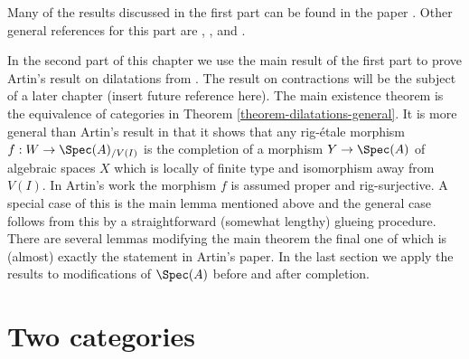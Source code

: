 \medskip\noindent
Many of the results discussed in the first part can be found in the paper
\cite{Elkik}. Other general references for this part are
\cite{EGA}, \cite{Abbes}, and \cite{Fujiwara-Kato}.

\medskip\noindent
In the second part of this chapter we use the main result of
the first part to prove Artin's result on dilatations from \cite{ArtinII}.
The result on contractions will be the subject of a later chapter
(insert future reference here).
The main existence theorem is the equivalence of categories in
Theorem \ref{theorem-dilatations-general}.
It is more general than Artin's result in that it shows that any
rig-\'etale morphism $f : W \to \Spec(A)_{/V(I)}$
is the completion of a morphism $Y \to \Spec(A)$
of algebraic spaces $X$ which is locally of finite type
and isomorphism away from $V(I)$. In Artin's work
the morphism $f$ is assumed proper and rig-surjective.
A special case of this is the main lemma mentioned
above and the general case follows from this by
a straightforward (somewhat lengthy) glueing procedure.
There are several lemmas modifying the main theorem
the final one of which is (almost) exactly the statement in
Artin's paper.
In the last section we apply the results to modifications
of $\Spec(A)$ before and after completion.









\section{Two categories}
\label{section-two-categories}

